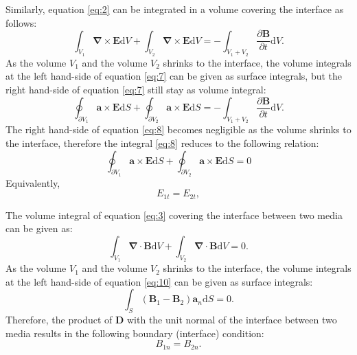 \documentclass[11pt]{amsart}
\begin{document}
Similarly, equation \ref{eq:2} can be integrated in a volume covering the interface as follows:
\begin{equation}
\label{eq:7}
\int_{V_1} \mathbf{\nabla}\times \mathbf{E} \mathrm{d} V + \int_{V_2} \mathbf{\nabla}\times \mathbf{E} \mathrm{d} V=-\int_{V_1+V_2} \frac{\partial \mathbf{B}}{\partial t} \mathrm{d} V.
\end{equation}
As the volume $V_1$ and the volume $V_2$ shrinks to the interface, the volume integrals at the left hand-side of equation \ref{eq:7} can be given as surface integrals, but the right hand-side of equation \ref{eq:7} still stay as volume integral:
\begin{equation}
\label{eq:8}
\oint_{\partial V_1} \mathbf{\mathbf{a}}\times \mathbf{E} \mathrm{d} S + \oint_{\partial V_2} \mathbf{\mathbf{a}}\times \mathbf{E} \mathrm{d} S=-\int_{V_1+V_2} \frac{\partial \mathbf{B}}{\partial t} \mathrm{d} V.
\end{equation}
The right hand-side of equation \ref{eq:8} becomes negligible as the volume shrinks to the interface, therefore the integral \ref{eq:8} reduces to the following relation:
\begin{equation}
\label{eq:9}
\oint_{\partial V_1} \mathbf{\mathbf{a}}\times \mathbf{E} \mathrm{d} S + \oint_{\partial V_2} \mathbf{\mathbf{a}}\times \mathbf{E} \mathrm{d} S=0
\end{equation}
Equivalently,
\begin{equation}
E_{1t}=E_{2t},
\end{equation}

The volume integral of equation \ref{eq:3} covering the interface between two media can be given as:
\begin{equation}
\label{eq:10}
\int_{V_1} \mathbf{\nabla}\cdot \mathbf{B} \mathrm{d} V + \int_{V_2} \mathbf{\nabla}\cdot \mathbf{B} \mathrm{d} V=0.
\end{equation}
As the volume $V_1$ and the volume $V_2$ shrinks to the interface\cite{Chadwick}, the volume integrals at the left hand-side of equation \ref{eq:10} can be given as surface integrals:
\begin{equation}
\label{eq:11}
\int_{S} (\mathbf{B}_1 -\mathbf{B}_2) \mathbf{a}_n\mathrm{d}S=0.
\end{equation}
Therefore, the product of $\mathbf{D}$ with the unit normal of the interface between two media results in the following boundary (interface) condition:
\begin{equation}
B_{1n}=B_{2n}.
\end{equation}
\end{document}

